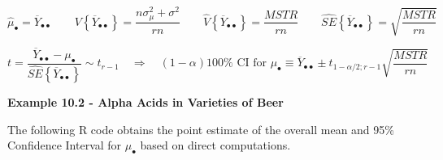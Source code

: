 \documentclass[
]{book}
\begin{document}
\[
\hat{\mu}_{\bullet}=\overline{Y}_{\bullet\bullet}  \qquad
V\left\{\overline{Y}_{\bullet\bullet}\right\}=
\frac{n\sigma_{\mu}^2+\sigma^2}{rn} \qquad
\hat{V}\left\{\overline{Y}_{\bullet\bullet}\right\} =
\frac{MSTR}{rn}
\qquad
\hat{SE}\left\{\overline{Y}_{\bullet\bullet}\right\} =
\sqrt{\frac{MSTR}{rn}}
\]

\[
t=\frac{\overline{Y}_{\bullet\bullet}-\mu_{\bullet}}{\hat{SE}\left\{\overline{Y}_{\bullet\bullet}\right\}} \sim t_{r-1}  \quad \Rightarrow \quad
(1-\alpha)100\% \mbox{ CI for } \mu_{\bullet} \equiv
\overline{Y}_{\bullet\bullet} \pm t_{1-\alpha/2;r-1}\sqrt{\frac{MSTR}{rn}}
\]

\textbf{Example 10.2 - Alpha Acids in Varieties of Beer}

The following R code obtains the point estimate of the overall mean and
95\% Confidence Interval for \(\mu_{\bullet}\) based on direct
computations.
\end{document}
